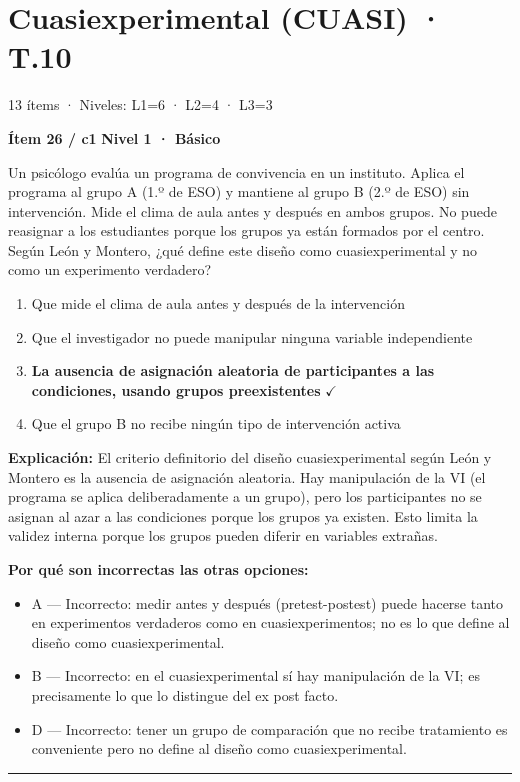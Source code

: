 \documentclass[12pt,a4paper]{article}
\begin{document}
\section{Cuasiexperimental (CUASI) · T.10}
{\small\color{gris} 13 ítems · Niveles: L1=6 · L2=4 · L3=3}

\begin{mdframed}[backgroundcolor=fondogris,linecolor=azul,linewidth=1pt,innerleftmargin=10pt,innerrightmargin=10pt,innertopmargin=7pt,innerbottommargin=7pt]
\textbf{Ítem 26 / c1} \hfill {\small\bfseries\color{azul} Nivel 1 · Básico}
\end{mdframed}

Un psicólogo evalúa un programa de convivencia en un instituto. Aplica el programa al grupo A (1.º de ESO) y mantiene al grupo B (2.º de ESO) sin intervención. Mide el clima de aula antes y después en ambos grupos. No puede reasignar a los estudiantes porque los grupos ya están formados por el centro. Según León y Montero, ¿qué define este diseño como cuasiexperimental y no como un experimento verdadero?

\begin{enumerate}
  \item[A.] Que mide el clima de aula antes y después de la intervención
  \item[B.] Que el investigador no puede manipular ninguna variable independiente
  \item[\textbf{\color{verde}C.}] \textbf{\color{verde} La ausencia de asignación aleatoria de participantes a las condiciones, usando grupos preexistentes} \hfill $\checkmark$
  \item[D.] Que el grupo B no recibe ningún tipo de intervención activa
\end{enumerate}

\noindent\textbf{\color{azul}Explicación:} El criterio definitorio del diseño cuasiexperimental según León y Montero es la ausencia de asignación aleatoria. Hay manipulación de la VI (el programa se aplica deliberadamente a un grupo), pero los participantes no se asignan al azar a las condiciones porque los grupos ya existen. Esto limita la validez interna porque los grupos pueden diferir en variables extrañas.

\noindent\textbf{\color{gris}Por qué son incorrectas las otras opciones:}
\begin{itemize}
  \item {\small A — Incorrecto: medir antes y después (pretest-postest) puede hacerse tanto en experimentos verdaderos como en cuasiexperimentos; no es lo que define al diseño como cuasiexperimental.}
  \item {\small B — Incorrecto: en el cuasiexperimental sí hay manipulación de la VI; es precisamente lo que lo distingue del ex post facto.}
  \item {\small D — Incorrecto: tener un grupo de comparación que no recibe tratamiento es conveniente pero no define al diseño como cuasiexperimental.}
\end{itemize}
\vspace{8pt}\hrule\vspace{10pt}
\end{document}
